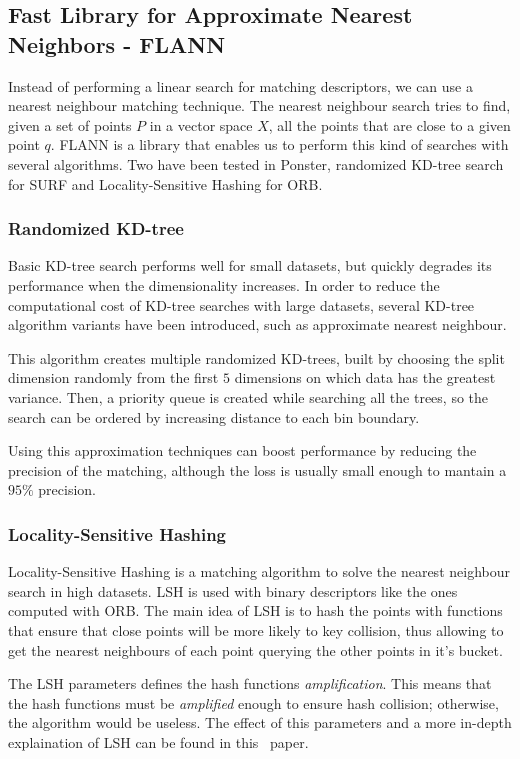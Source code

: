 \subsection{Fast Library for Approximate Nearest Neighbors - FLANN}
Instead of performing a linear search for matching descriptors, we can use a
nearest neighbour matching technique. The nearest neighbour search tries to
find, given a set of points $P$ in a vector space $X$, all the points that are 
close to a given point $q$. FLANN\cite{muja:fast}
is a library that enables us to perform this
kind of searches with several algorithms. Two have been tested in Ponster,
randomized KD-tree search for SURF and Locality-Sensitive Hashing for ORB.

\subsubsection{Randomized KD-tree}
Basic KD-tree search performs well for small datasets, but quickly degrades
its performance when the dimensionality increases. In order
to reduce the computational cost of KD-tree searches with large datasets, several
KD-tree algorithm variants have been introduced, such as approximate nearest
neighbour. 

This algorithm creates multiple randomized KD-trees, built by choosing the
split dimension randomly from the first $5$ dimensions on which data has the
greatest variance. Then, a priority queue is created while searching all the
trees, so the search can be ordered by increasing distance to each bin
boundary. 

Using this approximation techniques can boost performance by reducing the
precision of the matching, although the loss is usually small enough to mantain
a $95\%$ precision. 

\subsubsection{Locality-Sensitive Hashing}
Locality-Sensitive Hashing is a matching algorithm to solve the nearest
neighbour search in high datasets. LSH is used with binary descriptors like the
ones computed with ORB. The main idea of LSH is to hash the points with
functions that ensure that close points will be more likely to key collision,
thus allowing to get the nearest neighbours of each point querying the other
points in it's bucket\cite{Andoni:2008:NHA:1327452.1327494}.

The LSH parameters defines the hash functions \emph{amplification}. This means that
the hash functions must be \emph{amplified} enough to ensure hash collision;
otherwise, the algorithm would be useless. The effect of this parameters and a more
in-depth explaination of LSH can be found in
this~\cite{Andoni:2008:NHA:1327452.1327494} paper. 

